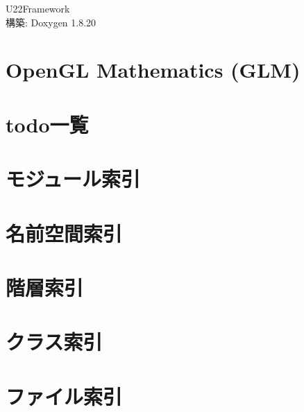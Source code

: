 \let\mypdfximage\pdfximage\def\pdfximage{\immediate\mypdfximage}\documentclass[twoside]{book}
\newcommand{\+}{\discretionary{\mbox{\scriptsize$\hookleftarrow$}}{}{}}
\newcommand{\clearemptydoublepage}{%
  \newpage{\pagestyle{empty}\cleardoublepage}%
}
\begin{document}
\begin{CJK}{UTF8}{min}

\hypersetup{pageanchor=false,
             bookmarksnumbered=true,
             pdfencoding=unicode
            }
\begin{titlepage}
\vspace*{7cm}
\begin{center}%
{\Large U22\+Framework }\\
\vspace*{1cm}
{\large 構築\+: Doxygen 1.8.20}\\
\end{center}
\end{titlepage}
\clearemptydoublepage
{}
\tableofcontents
\clearemptydoublepage
{}
\hypersetup{pageanchor=true}

\chapter{Open\+GL Mathematics (G\+LM)}
\label{index}\hypertarget{index}{}
\chapter{todo一覧}
\label{todo}

\chapter{モジュール索引}

\chapter{名前空間索引}

\chapter{階層索引}

\chapter{クラス索引}

\chapter{ファイル索引}


\end{CJK}
\end{document}
